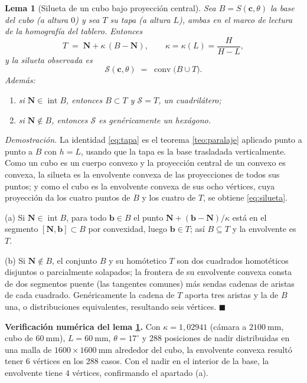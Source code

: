 \documentclass[11pt,a4paper]{article}
\newtheorem{lema}[teorema]{Lema}
\theoremstyle{definition}
\newenvironment{demo}{\par\noindent\textit{Demostración.}\;}{\hfill$\blacksquare$\par\medskip}
\newcommand{\cc}{\mathbf{c}}
\newcommand{\NN}{\mathbf{N}}
\newcommand{\conv}{\operatorname{conv}}
\newcommand{\intr}{\operatorname{int}}
\newcommand{\grados}{^{\circ}}
\begin{document}
\begin{lema}[Silueta de un cubo bajo proyección central]
\label{lema:silueta}
Sea $B = S(\cc,\theta)$ la base del cubo (a altura $0$) y sea $T$ su tapa (a altura $L$),
ambas en el marco de lectura de la homografía del tablero. Entonces
\begin{equation}
  T \;=\; \NN + \kappa\,(B - \NN), \qquad \kappa = \kappa(L) = \frac{H}{H-L},
  \label{eq:tapa}
\end{equation}
y la silueta observada es
\begin{equation}
  \mathcal S(\cc,\theta) \;=\; \conv\big(B \cup T\big).
  \label{eq:silueta}
\end{equation}
Además:
\begin{enumerate}[label=(\alph*),leftmargin=2.2em]
\item si $\NN \in \intr B$, entonces $B \subset T$ y $\mathcal S = T$, un cuadrilátero;
\item si $\NN \notin B$, entonces $\mathcal S$ es genéricamente un hexágono.
\end{enumerate}
\end{lema}

\begin{demo}
La identidad \eqref{eq:tapa} es el teorema \ref{teo:paralaje} aplicado punto a punto a
$B$ con $h=L$, usando que la tapa es la base trasladada verticalmente. Como un cubo es
un cuerpo convexo y la proyección central de un convexo es convexa, la silueta es la
envolvente convexa de las proyecciones de todos sus puntos; y como el cubo es la
envolvente convexa de sus ocho vértices, cuya proyección da los cuatro puntos de $B$ y
los cuatro de $T$, se obtiene \eqref{eq:silueta}.

(a) Si $\NN\in\intr B$, para todo $\mathbf b\in B$ el punto
$\NN + (\mathbf b-\NN)/\kappa$ está en el segmento $[\NN,\mathbf b] \subset B$ por
convexidad, luego $\mathbf b \in T$; así $B\subseteq T$ y la envolvente es $T$.

(b) Si $\NN \notin B$, el conjunto $B$ y su homótetico $T$ son dos cuadrados
homotéticos disjuntos o parcialmente solapados; la frontera de su envolvente convexa
consta de dos segmentos puente (las tangentes comunes) más sendas cadenas de aristas de
cada cuadrado. Genéricamente la cadena de $T$ aporta tres aristas y la de $B$ una, o
distribuciones equivalentes, resultando seis vértices.
\end{demo}

\begin{resultado}
\textbf{Verificación numérica del lema \ref{lema:silueta}.} Con $\kappa = 1{,}02941$
(cámara a $2100\ \mathrm{mm}$, cubo de $60\ \mathrm{mm}$), $L=60\ \mathrm{mm}$,
$\theta = 17\grados$ y $288$ posiciones de nadir distribuidas en una malla de
$1600\times1600\ \mathrm{mm}$ alrededor del cubo, la envolvente convexa resultó tener
$6$ vértices en los $288$ casos. Con el nadir en el interior de la base, la envolvente
tiene $4$ vértices, confirmando el apartado (a).
\end{resultado}
\end{document}
